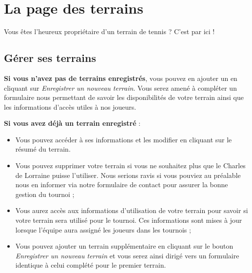 \section{La page des terrains}

Vous êtes l'heureux propriétaire d'un terrain de tennis ? C'est par ici !

\subsection{Gérer ses terrains}

\textbf{Si vous n'avez pas de terrains enregistrés}, vous pouvez en ajouter un
en cliquant sur \textit{Enregistrer un nouveau terrain}. Vous serez amené à
compléter un formulaire nous permettant de savoir les disponibilités de votre
terrain ainsi que les informations d'accès utiles à nos joueurs.

\textbf{Si vous avez déjà un terrain enregistré} :

\begin{itemize}
    \item Vous pouvez accéder à ses informations et les modifier en cliquant
    sur le résumé du terrain.
    \item Vous pouvez supprimer votre terrain si vous ne souhaitez plus que
    le Charles de Lorraine puisse l'utiliser. Nous serions ravis si vous
    pouviez au préalable nous en informer via notre formulaire de contact pour
    assurer la bonne gestion du tournoi ;
    \item Vous aurez accès aux informations d'utilisation de votre terrain pour
    savoir si votre terrain sera utilisé pour le tournoi. Ces informations
    sont mises à jour lorsque l'équipe aura assigné les joueurs dans les
    tournois ;
    \item Vous pouvez ajouter un terrain supplémentaire en cliquant sur le
    bouton \textit{Enregistrer un nouveau terrain} et vous serez ainsi dirigé
    vers un formulaire identique à celui complété pour le premier terrain.
\end{itemize}
